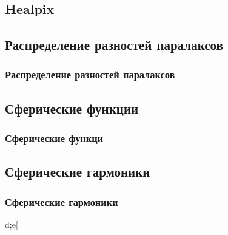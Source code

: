 \documentclass[14pt,aspectratio=43]{beamer}
\begin{document}
\subsection{Healpix}\label{sub:smthhealpix}
\begin{frame}[<alignment>]


\begin{figure}[h!]
\label{img:healpix}
\end{figure}

\end{frame}	

\subsection{Распределение разностей паралаксов}\label{sub:smthhealpix}
\begin{frame}[<alignment>]
\frametitle{Распределение разностей паралаксов}

\end{frame}	

\subsection{Сферические функции}\label{sistem}  
\begin{frame}[<alignment>]
\frametitle{Сферические функци}

\end{frame}	

\subsection{Сферические гармоники}\label{sistem}  
\begin{frame}[<alignment>]
\frametitle{Сферические гармоники}
d;e[

\end{frame}	
\end{document}
